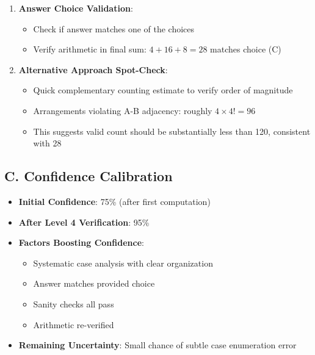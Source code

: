 \documentclass[]{article}
\begin{document}
\begin{verificationbox}
\begin{enumerate}[leftmargin=*]
    \item \textbf{Answer Choice Validation}:
    \begin{itemize}
        \item Check if answer matches one of the choices
        \item Verify arithmetic in final sum: $4 + 16 + 8 = 28$ matches choice (C)
    \end{itemize}
    
    \item \textbf{Alternative Approach Spot-Check}:
    \begin{itemize}
        \item Quick complementary counting estimate to verify order of magnitude
        \item Arrangements violating A-B adjacency: roughly $4 \times 4! = 96$
        \item This suggests valid count should be substantially less than 120, consistent with 28
    \end{itemize}
\end{enumerate}

\subsection*{C. Confidence Calibration}
\begin{itemize}[leftmargin=*]
    \item \textbf{Initial Confidence}: 75\% (after first computation)
    \item \textbf{After Level 4 Verification}: 95\%
    \item \textbf{Factors Boosting Confidence}:
    \begin{itemize}
        \item Systematic case analysis with clear organization
        \item Answer matches provided choice
        \item Sanity checks all pass
        \item Arithmetic re-verified
    \end{itemize}
    \item \textbf{Remaining Uncertainty}: Small chance of subtle case enumeration error
\end{itemize}
\end{verificationbox}
\end{document}
